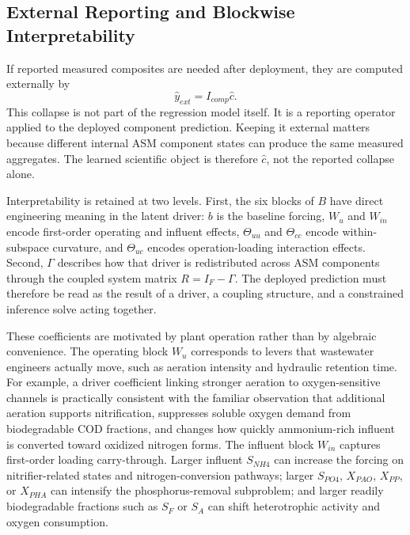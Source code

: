 \documentclass[11pt]{article}
\begin{document}
\subsection{External Reporting and Blockwise Interpretability}

If reported measured composites are needed after deployment, they are computed externally by
\[
\hat{y}_{ext} = I_{comp}\hat{c}.
\]
This collapse is not part of the regression model itself. It is a reporting operator applied to the deployed component prediction. Keeping it external matters because different internal ASM component states can produce the same measured aggregates. The learned scientific object is therefore $\hat{c}$, not the reported collapse alone.

Interpretability is retained at two levels. First, the six blocks of $B$ have direct engineering meaning in the latent driver: $b$ is the baseline forcing, $W_u$ and $W_{in}$ encode first-order operating and influent effects, $\Theta_{uu}$ and $\Theta_{cc}$ encode within-subspace curvature, and $\Theta_{uc}$ encodes operation-loading interaction effects. Second, $\Gamma$ describes how that driver is redistributed across ASM components through the coupled system matrix $R = I_F - \Gamma$. The deployed prediction must therefore be read as the result of a driver, a coupling structure, and a constrained inference solve acting together.

These coefficients are motivated by plant operation rather than by algebraic convenience. The operating block $W_u$ corresponds to levers that wastewater engineers actually move, such as aeration intensity and hydraulic retention time. For example, a driver coefficient linking stronger aeration to oxygen-sensitive channels is practically consistent with the familiar observation that additional aeration supports nitrification, suppresses soluble oxygen demand from biodegradable COD fractions, and changes how quickly ammonium-rich influent is converted toward oxidized nitrogen forms. The influent block $W_{in}$ captures first-order loading carry-through. Larger influent $S_{NH4}$ can increase the forcing on nitrifier-related states and nitrogen-conversion pathways; larger $S_{PO4}$, $X_{PAO}$, $X_{PP}$, or $X_{PHA}$ can intensify the phosphorus-removal subproblem; and larger readily biodegradable fractions such as $S_F$ or $S_A$ can shift heterotrophic activity and oxygen consumption.
\end{document}
